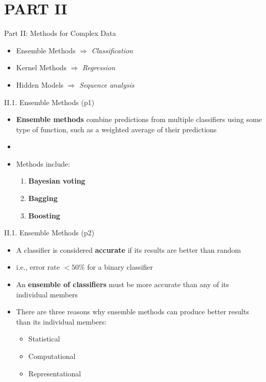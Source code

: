 \documentclass[handout]{beamer}
\newcommand{\strong}[1]{\textbf{\color{teal} #1}}
\newcommand{\stronger}[1]{\textbf{\color{purple} #1}}
\begin{document}
\section{PART II}
\begin{frame}{Part II: Methods for Complex Data}
\begin{itemize}
\item[II.1.] Ensemble Methods $\Rightarrow$ \emph{Classification}
\item[II.2.] Kernel Methods $\Rightarrow$ \emph{Regression}
\item[II.3.] Hidden Models $\Rightarrow$ \emph{Sequence analysis}
\end{itemize}
\end{frame}
\begin{frame}{II.1. Ensemble Methods (p1)} %
\begin{itemize}
\item \stronger{Ensemble methods} combine predictions from multiple classifiers using some type of function, such as a weighted average of their predictions
\item[]
\item Methods include:
	\begin{enumerate}
	\item \stronger{Bayesian voting}
	\item \stronger{Bagging}
	\item \stronger{Boosting}
	\end{enumerate}
\end{itemize}
\end{frame}
\begin{frame}{II.1. Ensemble Methods (p2)}
\begin{itemize}
\item A classifier is considered \strong{accurate} if its results are better than random 
\item[] i.e., error rate $< 50\%$ for a binary classifier
\item An \strong{ensemble of classifiers} must be more accurate than any of its individual members
\item There are three reasons why ensemble methods can produce better results than its individual members:
	\begin{itemize}
	\item Statistical
	\item Computational
	\item Representational
	\end{itemize}
\end{itemize}
\end{frame}
\end{document}
